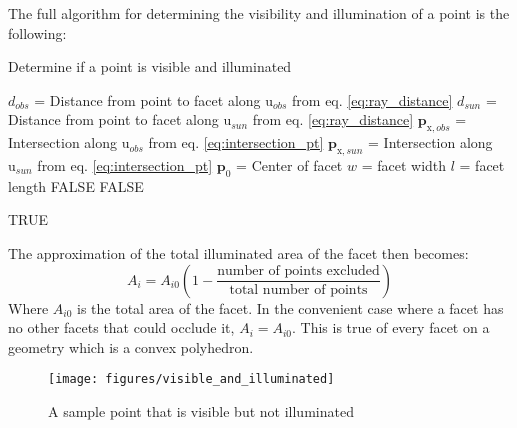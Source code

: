 The full algorithm for determining the visibility and illumination of a point is the following:
\begin{algorithm}
	\caption{Determine if a point is visible and illuminated}
	\begin{algorithmic}
		
			\STATE $d_{obs}$ = Distance from point to facet along $\bm{\mathrm{u}}_{obs}$ from eq. \ref{eq:ray_distance}
			\STATE $d_{sun}$ = Distance from point to facet along $\bm{\mathrm{u}}_{sun}$ from eq. \ref{eq:ray_distance}
			\STATE $\bm{p}_{\mathrm{x}, obs}$ = Intersection along $\bm{\mathrm{u}}_{obs}$ from eq. \ref{eq:intersection_pt} 
			\STATE $\bm{p}_{\mathrm{x}, sun}$ = Intersection along $\bm{\mathrm{u}}_{sun}$ from eq. \ref{eq:intersection_pt}
			\STATE $\bm{p}_0$ = Center of facet
			\STATE $w$ = facet width
			\STATE $l$ = facet length
				\RETURN FALSE 
			\ENDIF
			\ENDIF
				\RETURN FALSE 
			\ENDIF
			\ENDIF
			
		\ENDFOR
		\RETURN TRUE 

	\end{algorithmic}
\end{algorithm}

The approximation of the total illuminated area of the facet then becomes:
\begin{equation}
A_i = A_{i0} \left( 1 - \frac{\text{number of points excluded}}{\text{total number of points}} \right)
\end{equation}
Where $A_{i0}$ is the total area of the facet. In the convenient case where a facet has no other facets that could occlude it, $A_i = A_{i0}$. This is true of every facet on a geometry which is a convex polyhedron.
\begin{figure}[h!]
	\centering
	\texttt{[image: figures/visible\_and\_illuminated]}
	\caption{A sample point that is visible but not illuminated}
	\label{sample_pts}
\end{figure}